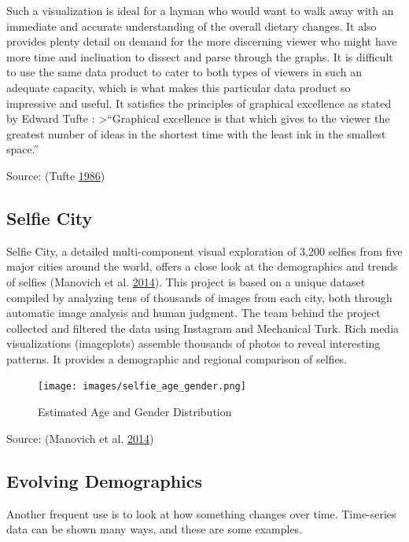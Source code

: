 \documentclass[]{book}
\begin{document}
Such a visualization is ideal for a layman who would want to walk away with an immediate and accurate understanding of the overall dietary changes. It also provides plenty detail on demand for the more discerning viewer who might have more time and inclination to dissect and parse through the graphs. It is difficult to use the same data product to cater to both types of viewers in such an adequate capacity, which is what makes this particular data product so impressive and useful. It satisfies the principles of graphical excellence as stated by Edward Tufte :
\textgreater{}``Graphical excellence is that which gives to the viewer the greatest number of ideas in the shortest time with the least ink in the smallest space.''

Source: (Tufte \protect\hyperlink{ref-The-Visual-Display-of-Quantitative-Information}{1986})

\hypertarget{selfie-city}{%
\subsection{Selfie City}\label{selfie-city}}

Selfie City, a detailed multi-component visual exploration of 3,200 selfies from five major cities around the world, offers a close look at the demographics and trends of selfies (Manovich et al. \protect\hyperlink{ref-selfie}{2014}). This project is based on a unique dataset compiled by analyzing tens of thousands of images from each city, both through automatic image analysis and human judgment. The team behind the project collected and filtered the data using Instagram and Mechanical Turk. Rich media visualizations (imageplots) assemble thousands of photos to reveal interesting patterns. It provides a demographic and regional comparison of selfies.

\begin{figure}
\centering
\texttt{[image: images/selfie\_age\_gender.png]}
\caption{Estimated Age and Gender Distribution}
\end{figure}

Source: (Manovich et al. \protect\hyperlink{ref-selfie}{2014})

\hypertarget{evolving-demographics}{%
\subsection{Evolving Demographics}\label{evolving-demographics}}

Another frequent use is to look at how something changes over time. Time-series data can be shown many ways, and these are some examples.
\end{document}

